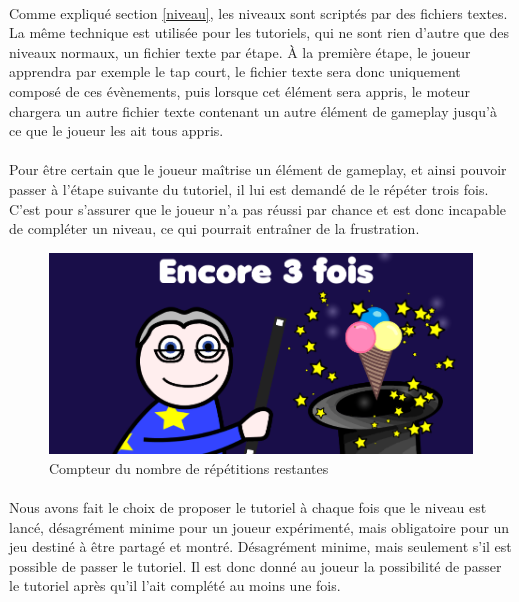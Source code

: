 \paragraph{}
Comme expliqué section \ref{niveau}, les niveaux sont scriptés par des fichiers textes. La même technique est utilisée pour les tutoriels, qui ne sont rien d'autre que des niveaux normaux, un fichier texte par étape. À la première étape, le joueur apprendra par exemple le tap court, le fichier texte sera donc uniquement composé de ces évènements, puis lorsque cet élément sera appris, le moteur chargera un autre fichier texte contenant un autre élément de gameplay jusqu'à ce que le joueur les ait tous appris.

\paragraph{}
Pour être certain que le joueur maîtrise un élément de gameplay, et ainsi pouvoir passer à l'étape suivante du tutoriel, il lui est demandé de le répéter trois fois. C'est pour s'assurer que le joueur n'a pas réussi par chance et est donc incapable de compléter un niveau, ce qui pourrait entraîner de la frustration.


\begin{figure}[H]\centering
  \includegraphics[scale=0.28]{./img/compteur_tuto.png}
  \caption{Compteur du nombre de répétitions restantes}
  \label{repetitions}
\end{figure}

\paragraph{}
Nous avons fait le choix de proposer le tutoriel à chaque fois que le niveau est lancé, désagrément minime pour un joueur expérimenté, mais obligatoire pour un jeu destiné à être partagé et montré. Désagrément minime, mais seulement s'il est possible de passer le tutoriel. Il est donc donné au joueur la possibilité de passer le tutoriel après qu'il l'ait complété au moins une fois.

